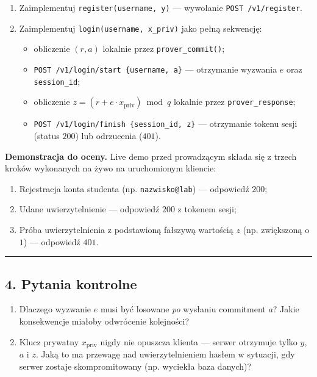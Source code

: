 \documentclass[
]{article}
\providecommand{\tightlist}{%
  \setlength{\itemsep}{0pt}\setlength{\parskip}{0pt}}
\let\oldrule\rule
\renewcommand{\rule}[2]{\noindent\oldrule{\linewidth}{0.4pt}}
\begin{document}
\begin{enumerate}
\def\labelenumi{\arabic{enumi}.}
\tightlist
\item
  Zaimplementuj \texttt{register(username,\ y)} --- wywołanie
  \texttt{POST\ /v1/register}.
\item
  Zaimplementuj \texttt{login(username,\ x\_priv)} jako pełną sekwencję:

  \begin{itemize}
  \tightlist
  \item
    obliczenie \((r, a)\) lokalnie przez \texttt{prover\_commit()};
  \item
    \texttt{POST\ /v1/login/start\ \{username,\ a\}} --- otrzymanie
    wyzwania \(e\) oraz \texttt{session\_id};
  \item
    obliczenie \(z = (r + e \cdot x_{\mathrm{priv}}) \bmod q\) lokalnie
    przez \texttt{prover\_response};
  \item
    \texttt{POST\ /v1/login/finish\ \{session\_id,\ z\}} --- otrzymanie
    tokenu sesji (status \(200\)) lub odrzucenia (\(401\)).
  \end{itemize}
\end{enumerate}

\textbf{Demonstracja do oceny.} Live demo przed prowadzącym składa się z
trzech kroków wykonanych na żywo na uruchomionym kliencie:

\begin{enumerate}
\def\labelenumi{\arabic{enumi}.}
\tightlist
\item
  Rejestracja konta studenta (np. \texttt{nazwisko@lab}) --- odpowiedź
  \(200\);
\item
  Udane uwierzytelnienie --- odpowiedź \(200\) z tokenem sesji;
\item
  Próba uwierzytelnienia z podstawioną fałszywą wartością \(z\) (np.
  zwiększoną o \(1\)) --- odpowiedź \(401\).
\end{enumerate}

\begin{center}\rule{0.5\linewidth}{0.5pt}\end{center}

\subsection{4. Pytania kontrolne}\label{pytania-kontrolne}

\begin{enumerate}
\def\labelenumi{\arabic{enumi}.}
\tightlist
\item
  Dlaczego wyzwanie \(e\) musi być losowane \emph{po} wysłaniu
  commitment \(a\)? Jakie konsekwencje miałoby odwrócenie kolejności?
\item
  Klucz prywatny \(x_{\mathrm{priv}}\) nigdy nie opuszcza klienta ---
  serwer otrzymuje tylko \(y\), \(a\) i \(z\). Jaką to ma przewagę nad
  uwierzytelnieniem hasłem w sytuacji, gdy serwer zostaje
  skompromitowany (np. wyciekła baza danych)?
\end{enumerate}
\end{document}
